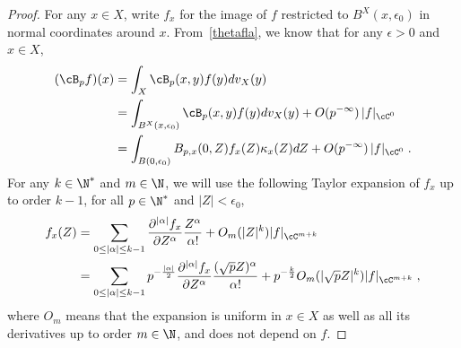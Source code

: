 \begin{proof}
For any $x\in X$, write $f_x$ for the image of $f$ restricted to $B^X(x,\epsilon_0)$ in normal coordinates around $x$. From~\eqref{thetafla}, we know that for any $\epsilon>0$ and $x\in X$,
\begin{equation}\label{KStheta}
\begin{split}
(\cB_pf)(x)&=\int_X \cB_p(x,y)f(y)dv_X(y)\\
&=\int_{B^X(x,\epsilon_0)}\cB_p(x,y)f(y)dv_X(y) +O(p^{-\infty})\,|f|_{\cC^0}\\
&=\int_{B(0,\epsilon_0)}B_{p,x}(0,Z)f_x(Z)\kappa_x(Z)dZ +O(p^{-\infty})\,|f|_{\cC^0}\;.
\end{split}
\end{equation}
For any $k\in\N^*$ and $m\in\N$, we will use the following Taylor expansion of $f_x$ up to order $k-1$, for all $p\in\N^*$ and $|Z|<\epsilon_0$,
\begin{equation}\label{Taylorfk}
\begin{split}
f_{x}(Z) &=\sum_{0\leq|\alpha|\leq k-1}\frac{\partial^{|\alpha|} f_{x}}{\partial Z^\alpha}\frac{Z^\alpha}{\alpha!} +O_m(|Z|^{k})|f|_{\cC^{m+k}}\\
&=\sum_{0\leq |\alpha|\leq k-1}p^{-\frac{|\alpha|}{2}}\frac{\partial^{|\alpha|} f_{x}}{\partial Z^\alpha}\frac{(\sqrt{p}Z)^\alpha}{\alpha!}+p^{-\frac{k}{2}}O_m(|\sqrt{p}Z|^{k})|f|_{\cC^{m+k}}\;,
\end{split}
\end{equation}
where $O_m$ means that the expansion is uniform in $x\in X$ as well as all its derivatives up to order $m\in\N$, and does not depend on $f$.


\end{proof}
